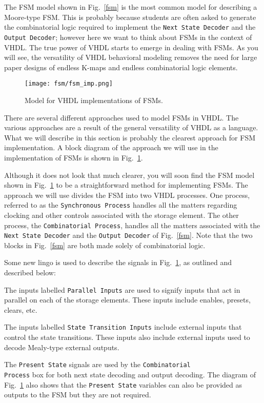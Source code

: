 The FSM model shown in Fig.~\ref{fsm} is the most common model for describing a Moore-type FSM. This is probably because students are often asked to generate the combinatorial logic required to implement the \texttt{Next State Decoder} and the \texttt{Output Decoder}; however here we want to think about FSMs in the context of VHDL. The true power of VHDL starts to emerge in dealing with FSMs. As you will see, the versatility of VHDL behavioral modeling removes the need for large paper designs of endless K-maps and endless combinatorial logic elements.

\begin{figure}[t]
    \centering
	\texttt{[image: fsm/fsm\_imp.png]}
	\caption{Model for VHDL implementations of FSMs.}
	\label{fsm_imp}
\end{figure}

There are several different approaches used to model FSMs in VHDL. The various approaches are a result of the general versatility of VHDL as a language. What we will describe in this section is probably the clearest approach for FSM implementation. A block diagram of the approach we will use in the implementation of FSMs is shown in Fig.~\ref{fsm_imp}.

Although it does not look that much clearer, you will soon find the FSM model shown in Fig.~\ref{fsm_imp} to be a straightforward method for implementing FSMs. The approach we will use divides the FSM into two VHDL processes. One process, referred to as the \texttt{Synchronous Process} handles all the matters regarding clocking and other controls associated with the storage element. The other process, the \texttt{Combinatorial Process}, handles all the matters associated with the \texttt{Next State Decoder} and the \texttt{Output Decoder} of Fig.~\ref{fsm}. Note that the two blocks in Fig.~\ref{fsm} are both made solely of combinatorial logic.


Some new lingo is used to describe the signals in Fig.~\ref{fsm_imp}, as outlined and described below:
\begin{my_list}
\item The inputs labelled \texttt{Parallel Inputs} are used to signify inputs that act in parallel on each of the storage elements. These inputs include enables, presets, clears, etc.

\item The inputs labelled \texttt{State Transition Inputs} include external inputs that control the state transitions. These inputs also include external inputs used to decode Mealy-type external outputs.

\item The \texttt{Present State} signals are used by the \texttt{Combinatorial \\ Process} box for both next state decoding and output decoding. The diagram of Fig.~\ref{fsm_imp} also shows that the \texttt{Present State} variables can also be provided as outputs to the FSM but they are not required.
\end{my_list}


